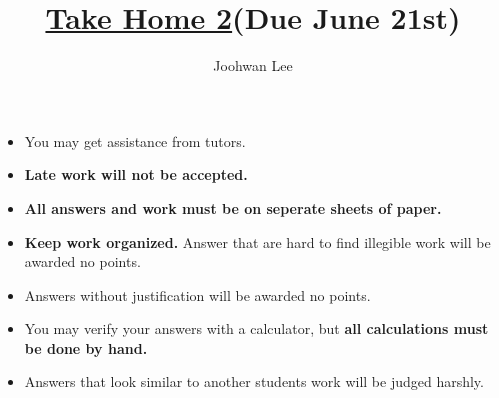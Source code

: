 \documentclass[10pt,letterpaper]{article}
\author{Joohwan Lee}
\title{\underline{Take Home 2}{\tiny {\bf (Due June 21st)}}}
\date{}
\begin{document}
\makeatletter
\renewcommand{\@maketitle}{
\newpage
 \null
 \vskip 2em%
 \begin{center}%
  {\LARGE \@title \par}%
 \end{center}%
 \par} \makeatother
\maketitle


\begin{itemize}[noitemsep]
\item You may get assistance from tutors.
\item {\bf Late work will not be accepted.}
\item {\bf All answers and work must be on seperate sheets of paper.}
\item {\bf Keep work organized.}  Answer that are hard to find illegible work will be awarded no points.
\item Answers without justification will be awarded no points.
\item You may verify your answers with a calculator, but {\bf all calculations must be done by hand.}
\item Answers that look similar to another students work will be judged harshly.
\end{itemize}
\end{document}
